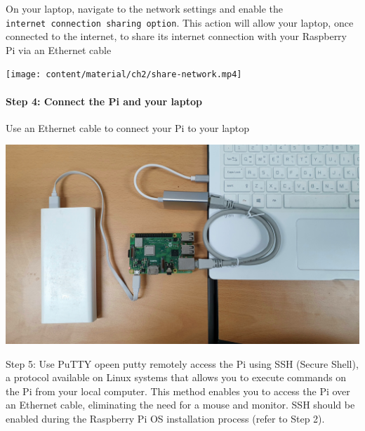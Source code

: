 \documentclass[
  letterpaper,
  DIV=11,
  numbers=noendperiod]{scrreprt}
\begin{document}
On your laptop, navigate to the network settings and enable the
\texttt{internet\ connection\ sharing\ option}. This action will allow
your laptop, once connected to the internet, to share its internet
connection with your Raspberry Pi via an Ethernet cable

\texttt{[image: content/material/ch2/share-network.mp4]}

\hypertarget{step-4-connect-the-pi-and-your-laptop}{%
\subsection*{Step 4: Connect the Pi and your
laptop}\label{step-4-connect-the-pi-and-your-laptop}}

Use an Ethernet cable to connect your Pi to your laptop

\includegraphics{content/material/ch2/connect-pi.jpg}

Step 5: Use PuTTY opeen putty remotely access the Pi using SSH (Secure
Shell), a protocol available on Linux systems that allows you to execute
commands on the Pi from your local computer. This method enables you to
access the Pi over an Ethernet cable, eliminating the need for a mouse
and monitor. SSH should be enabled during the Raspberry Pi OS
installation process (refer to Step 2).

\part{}

\hypertarget{section-2}{%
\chapter{}\label{section-2}}
\end{document}

